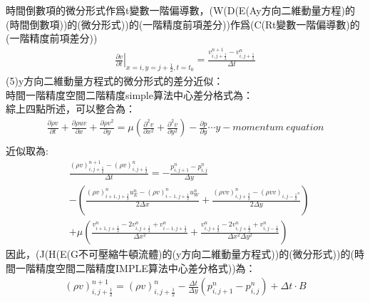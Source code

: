 \documentclass[12pt]{article}
\begin{document}
時間倒數項的微分形式作爲t變數一階偏導數，(W(D(E(Ay方向二維動量方程)的(時間倒數項))的(微分形式))的(一階精度前項差分))作爲(C(Rt變數一階偏導數)的(一階精度前項差分))\\[1.5ex]
\begin{equation}\begin{split}
    \left.\frac{\partial v}{\partial t}\right|_{x=i,y= j+\frac{1}{2},t = t_0} = \frac{v_{i,j+\frac{1}{2}}^{n+1} - v_{i,j+\frac{1}{2}}^{n}}{\Delta t}
\end{split}\end{equation}
\noindent (5)y方向二維動量方程式的微分形式的差分近似：\\
時間一階精度空間二階精度simple算法中心差分格式為：\\
\noindent 綜上四點所述，可以整合為：
\begin{equation}\begin{split}
    \frac{\partial \rho v}{\partial t} + \frac{\partial \rho u v}{\partial x} + \frac{\partial \rho v^{2}}{\partial y} = \mu\left(\frac{\partial^{2} v}{\partial x^{2}} + \frac{\partial^{2} v}{\partial y^{2}}\right) - \frac{\partial p}{\partial y} \cdots y-momentum\ equation\\[1.5ex]
\end{split}\end{equation}
\noindent 近似取為:
\begin{equation}\begin{split}
    &\frac{(\rho v)_{i,j+\frac{1}{2}}^{n+1} - (\rho v)_{i,j+\frac{1}{2}}^{n}}{\Delta t} = -\frac{p_{i,j+1}^{n} - p_{i,j}^{n}}{\Delta y} \\[1.5ex]
    & - \left(\frac{(\rho v)_{i+1,j+\frac{1}{2}}^{n}u_{E}^{n} - (\rho v)_{i-1,j+\frac{1}{2}}^{n}u_{W}^{n}}{2\Delta x} + \frac{(\rho v v)_{i,j+\frac{3}{2}}^{n} - (\rho v v)_{i,j-\frac{1}{2}^{n}}}{2\Delta y}\right)\\[1.5ex]
    & + \mu \left(\frac{v_{i+1,j+\frac{1}{2}}^{n}-2v_{i,j+\frac{1}{2}}^{n}+v_{i-1,j+\frac{1}{2}}^{n}}{\Delta x^{2}} + \frac{v_{i,j+\frac{3}{2}}^{n}-2v_{i,j+\frac{1}{2}}^{n}+v_{i,j-\frac{1}{2}}^{n}}{\Delta x^{2}\Delta y^{2}}\right)
\end{split}\end{equation}
\noindent 因此，(J(H(E(G不可壓縮牛頓流體)的(y方向二維動量方程式))的(微分形式))的(時間一階精度空間二階精度IMPLE算法中心差分格式))為：\\
\begin{equation}\begin{split}
    (\rho v)_{i,j+\frac{1}{2}}^{n+1} = (\rho v)_{i,j+\frac{1}{2}}^{n} - \frac{\Delta t}{\Delta y}(p_{i,j+1}^{n} - p_{i,j}^{n}) + \Delta t \cdot B
\end{split}\end{equation}
\end{document}
